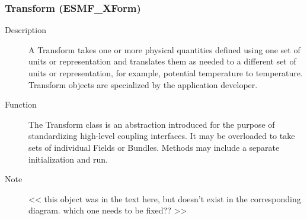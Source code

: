 \subsubsection{Transform (ESMF\_XForm)} 
\begin{description}
\item [Description] A Transform takes one or more physical quantities defined using one set 
of units or representation and translates them as needed to a different set of units or 
representation, for example, potential temperature to temperature.  Transform objects 
are specialized by the application developer.
\item [Function] The Transform class is an abstraction introduced for the
purpose of standardizing high-level coupling interfaces.  It may be overloaded
to take sets of individual Fields or Bundles.  Methods may include a
separate initialization and run. 
\item [Note] << this object was in the text here, but doesn't
exist in the corresponding diagram.  which one needs to be fixed?? >>
\end{description}






